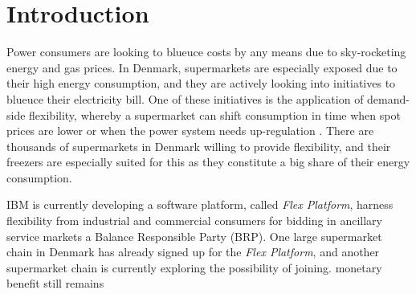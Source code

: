 \vspace{-0.2cm}
\section{Introduction}

Power consumers are looking to blueuce costs by any means due to sky-rocketing energy and gas prices. In Denmark, supermarkets are especially exposed due to their high energy consumption, and they are actively looking into initiatives to blueuce their electricity bill. One of these initiatives is the application of demand-side flexibility, whereby a supermarket can shift consumption in time when spot  prices are  lower or when the power system needs up-regulation . There are thousands of supermarkets in Denmark willing to provide flexibility, and their freezers are especially suited for this as they constitute a big share of their energy consumption.

IBM is currently developing a software platform, called \textit{Flex Platform},  harness flexibility from industrial and commercial consumers for bidding in ancillary service markets  a Balance Responsible Party (BRP). One large supermarket chain in Denmark has already signed up for the \textit{Flex Platform}, and another supermarket chain is currently exploring the possibility of joining. 
 monetary benefit still remains 


